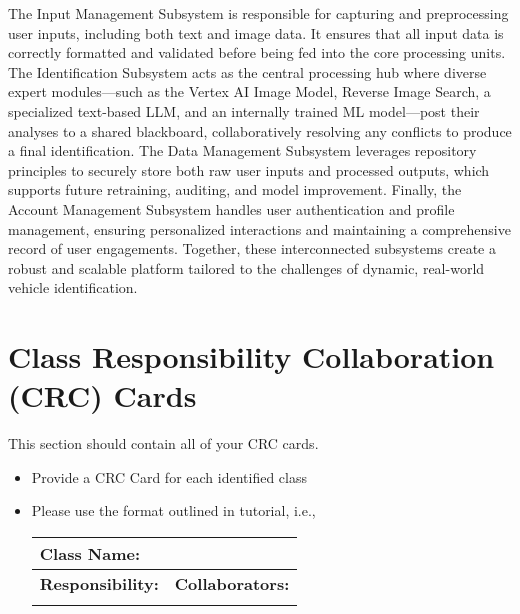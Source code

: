\documentclass[]{article}
\begin{document}
\noindent The Input Management Subsystem is responsible for capturing and preprocessing user inputs, including both text and image data. It ensures that all input data is correctly formatted and validated before being fed into the core processing units. The Identification Subsystem acts as the central processing hub where diverse expert modules—such as the Vertex AI Image Model, Reverse Image Search, a specialized text-based LLM, and an internally trained ML model—post their analyses to a shared blackboard, collaboratively resolving any conflicts to produce a final identification. The Data Management Subsystem leverages repository principles to securely store both raw user inputs and processed outputs, which supports future retraining, auditing, and model improvement. Finally, the Account Management Subsystem handles user authentication and profile management, ensuring personalized interactions and maintaining a comprehensive record of user engagements. Together, these interconnected subsystems create a robust and scalable platform tailored to the challenges of dynamic, real-world vehicle identification.


	
\section{Class Responsibility Collaboration (CRC) Cards}
\label{sec:class_responsibility_collaboration_crc_cards}
This section should contain all of your CRC cards.

\begin{itemize}
	\item Provide a CRC Card for each identified class
	\item Please use the format outlined in tutorial, i.e., 
	\begin{table}[ht]
		\centering
		\begin{tabular}{|p{5cm}|p{5cm}|}
		\hline 
		 \multicolumn{2}{|l|}{\textbf{Class Name:}} \\
		\hline
		\textbf{Responsibility:} & \textbf{Collaborators:} \\
		\hline
		\vspace{1in} & \\
		\hline
		\end{tabular}
	\end{table}
	
\end{itemize}
\end{document}
